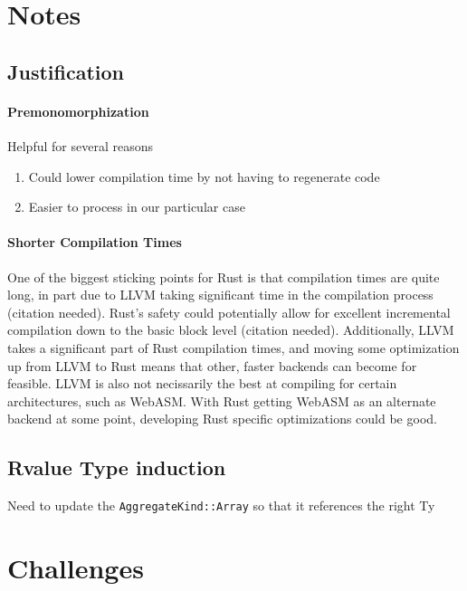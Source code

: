 \documentclass[12pt,final]{article}
\begin{document}
\section{Notes}
\label{sec:remove}

\subsection{Justification}
\label{sec:just}

\paragraph{Premonomorphization} Helpful for several reasons
\begin{enumerate}
\item Could lower compilation time by not having to regenerate code
\item  Easier to process in our particular case
\end{enumerate}

\paragraph{Shorter Compilation Times} One of the biggest sticking points for
Rust is that compilation times are quite long, in part due to LLVM taking
significant time in the compilation process (citation needed). Rust's safety
could potentially allow for excellent incremental compilation down to the basic
block level (citation needed). Additionally, LLVM takes a significant part of
Rust compilation times, and moving some optimization up from LLVM to Rust means
that other, faster backends can become for feasible. LLVM is also not
necissarily the best at compiling for certain architectures, such as WebASM.
With Rust getting WebASM as an alternate backend at some point, developing Rust
specific optimizations could be good.


\subsection{Rvalue Type induction}
Need to update the \texttt{AggregateKind::Array} so that it references the right Ty

\section{Challenges}
\label{sec:annoying}
\end{document}
